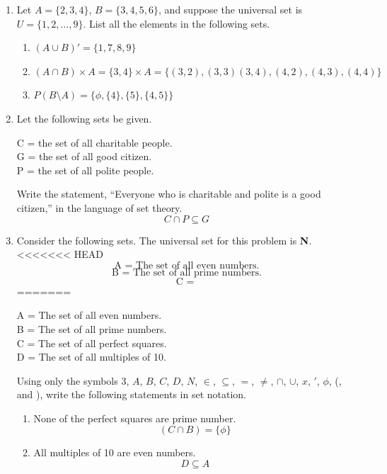 \documentclass[12pt]{article}
\begin{document}
\begin{enumerate}
\begin{center}
    \end{center}
  \item Let $A = \{2, 3, 4\}$, $B = \{3, 4, 5, 6\}$, and suppose the universal set is $U = \{1, 2, …, 9\}$. List all the elements in the following sets.
  \begin{enumerate}
    \item $(A \cup B)' = \{1,7,8,9\}$
    \item $(A \cap B) \times A = \{3,4\} \times A = \{(3,2),(3,3)(3,4),(4,2),(4,3),(4,4)\}$ 
    \item $P(B\setminus A) = \{\phi, \{4\}, \{5\}, \{4,5\}\}$
  \end{enumerate}
  \newpage
  \item Let the following sets be given.
  \begin{center}
    C = the set of all charitable people.\\
    G = the set of all good citizen.\\
    P = the set of all polite people.\\
  \end{center}
    Write the statement, “Everyone who is charitable and polite is a good citizen,” in the language of set theory.
    \[C \cap P \subseteq G\]
  \item Consider the following sets. The universal set for this problem is \textbf{N}.
<<<<<<< HEAD
    \[\text{A = The set of all even numbers.}\]
    \[\text{B = The set of all prime numbers.}\]
    \[\text{C = }\]
=======
  \begin{center}
    A = The set of all even numbers.\\
    B = The set of all prime numbers.\\
    C = The set of all perfect squares.\\
    D = The set of all multiples of 10.\\
  \end{center}
  Using only the symbols 3, $A$, $B$, $C$, $D$, $N$, $\in$, $\subseteq$, $=$, $\neq$, $\cap$, $\cup$, $x$, $'$, $\phi$, (, and ), write the following statements in set notation.
  \begin{enumerate}
    \item None of the perfect squares are prime number.
      \[(C \cap B) = \{\phi\}\]
    \item All multiples of 10 are even numbers.
      \[D \subseteq A\]

\end{enumerate}
\end{enumerate}
\end{document}
